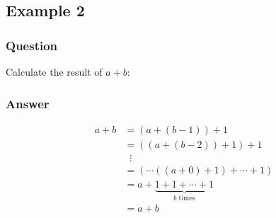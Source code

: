 \documentclass{article}
\begin{document}
\subsection{Example 2}
\subsubsection{Question}
Calculate the result of \(a + b\):
\subsubsection{Answer}
\[
    \begin{aligned}
        a + b & = (a + (b-1)) + 1                                       \\
              & = ((a + (b-2)) + 1) + 1                                 \\
              & \;\;\vdots                                              \\
              & = (\cdots((a + 0) + 1) + \cdots + 1)                    \\
              & = a + \underbrace{1 + 1 + \cdots + 1}_{b \text{ times}} \\
              & = a + b
    \end{aligned}
\]
\end{document}
